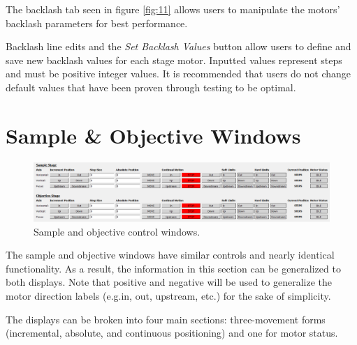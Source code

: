 \documentclass[a4paper, 12pt]{report}
\begin{document}
    The backlash tab seen in figure \ref{fig:11} allows users to manipulate the motors' backlash parameters for best performance.
    
    Backlash line edits and the \textit{Set Backlash Values} button allow users to define and save new backlash values for each stage motor. Inputted values represent steps and must be positive integer values. It is recommended that users do not change default values that have been proven through testing to be optimal.
    
    
    \section{Sample \& Objective Windows}
    \begin{figure}[h]
        \centering
        \includegraphics[width=\textwidth]{figures/sample_objective_window.png}
        \caption{Sample and objective control windows.}
        \label{fig:9}
    \end{figure}

    The sample and objective windows have similar controls and nearly identical functionality. As a result, the information in this section can be generalized to both displays. Note that positive and negative will be used to generalize the motor direction labels (e.g.in, out, upstream, etc.) for the sake of simplicity.
    
    The displays can be broken into four main sections: three-movement forms (incremental, absolute, and continuous positioning) and one for motor status.
    
\end{document}
